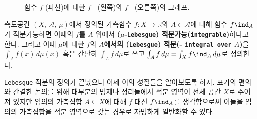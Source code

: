 \begin{figure}[!ht]
{
    }
    \caption{함수 $f$ (파선)에 대한 $f_+$ (왼쪽)와 $f_-$ (오른쪽)의 그래프.}
\end{figure}

\begin{definition}
    측도공간 $(X,\,\mathcal{A},\,\mu)$에서 정의된 가측함수 $f:X\to\overline{\mathbb{R}}$와 $A\in\mathcal{A}$에 대해 함수 $f\ind_A$가 적분가능하면 이때의 $f$를 $A$ 위에서 \textbf{($\mu$-\texttt{Lebesgue}) 적분가능(\texttt{integrable})}하다고 한다. 그리고 이때 $\mu$에 대한 $f$의 \textbf{$A$에서의 (\texttt{Lebesgue}) 적분(- \texttt{integral over} $A$)}을 $\int_Af(x)\,d\mu(x)$ 혹은 간단히 $\int_Af\,d\mu$로 쓰고 $\int_Af\,d\mu=\int_Xf\ind_A\,d\mu$로 정의한다.
\end{definition}

\texttt{Lebesgue} 적분의 정의가 끝났으니 이제 이의 성질들을 알아보도록 하자. 표기의 편의와 간결한 논의를 위해 대부분의 명제나 정리들에서 적분 영역이 전체 공간 $X$로 주어져 있지만 임의의 가측집합 $A\subseteq X$에 대해 $f$ 대신 $f\ind_A$를 생각함으로써 이들을 임의의 가측집합을 적분 영역으로 갖는 경우로 자명하게 일반화할 수 있다.

